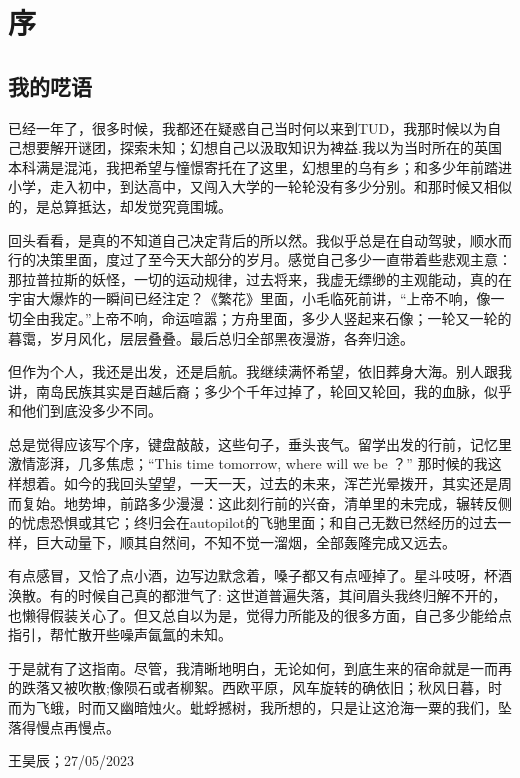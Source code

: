\section{ 序}
\subsection{我的呓语}
已经一年了，很多时候，我都还在疑惑自己当时何以来到TUD，我那时候以为自己想要解开谜团，探索未知；幻想自己以汲取知识为裨益.我以为当时所在的英国本科满是混沌，我把希望与憧憬寄托在了这里，幻想里的乌有乡；和多少年前踏进小学，走入初中，到达高中，又闯入大学的一轮轮没有多少分别。和那时候又相似的，是总算抵达，却发觉究竟围城。

回头看看，是真的不知道自己决定背后的所以然。我似乎总是在自动驾驶，顺水而行的决策里面，度过了至今天大部分的岁月。感觉自己多少一直带着些悲观主意：那拉普拉斯的妖怪，一切的运动规律，过去将来，我虚无缥缈的主观能动，真的在宇宙大爆炸的一瞬间已经注定？《繁花》里面，小毛临死前讲，“上帝不响，像一切全由我定。”上帝不响，命运喧嚣；方舟里面，多少人竖起来石像；一轮又一轮的暮霭，岁月风化，层层叠叠。最后总归全部黑夜漫游，各奔归途。

但作为个人，我还是出发，还是启航。我继续满怀希望，依旧葬身大海。别人跟我讲，南岛民族其实是百越后裔；多少个千年过掉了，轮回又轮回，我的血脉，似乎和他们到底没多少不同。

总是觉得应该写个序，键盘敲敲，这些句子，垂头丧气。留学出发的行前，记忆里激情澎湃，几多焦虑；“This time tomorrow, where will we be ？” 那时候的我这样想着。如今的我回头望望，一天一天，过去的未来，浑芒光晕拨开，其实还是周而复始。地势坤，前路多少漫漫：这此刻行前的兴奋，清单里的未完成，辗转反侧的忧虑恐惧或其它；终归会在autopilot的飞驰里面；和自己无数已然经历的过去一样，巨大动量下，顺其自然间，不知不觉一溜烟，全部轰隆完成又远去。

有点感冒，又恰了点小酒，边写边默念着，嗓子都又有点哑掉了。星斗吱呀，杯酒涣散。有的时候自己真的都泄气了: 这世道普遍失落，其间眉头我终归解不开的，也懒得假装关心了。但又总自以为是，觉得力所能及的很多方面，自己多少能给点指引，帮忙散开些噪声氤氲的未知。

于是就有了这指南。尽管，我清晰地明白，无论如何，到底生来的宿命就是一而再的跌落又被吹散;像陨石或者柳絮。西欧平原，风车旋转的确依旧；秋风日暮，时而为飞蛾，时而又幽暗烛火。蚍蜉撼树，我所想的，只是让这沧海一粟的我们，坠落得慢点再慢点。
\begin{flushright}
王昊辰；27/05/2023
\end{flushright}

\vspace{\betsubsec} %
